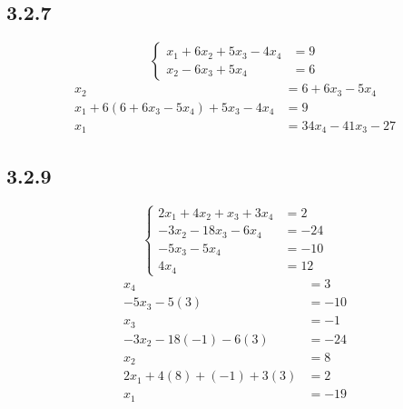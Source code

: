 \documentclass{article}
\begin{document}
\subsection{3.2.7}
\begin{equation*}
	\left\{
		\begin{aligned}
			x_1 + 6x_2 + 5x_3 - 4x_4 & = 9 \\
			x_2 - 6x_3 + 5x_4 & = 6
		\end{aligned}
	\right.
\end{equation*}
\begin{align*}
	x_2 & = 6 + 6x_3 - 5x_4 \\
	x_1 + 6(6 + 6x_3 - 5x_4) + 5x_3 - 4x_4 & = 9 \\
	x_1 & = 34x_4 - 41x_3 - 27
\end{align*}

\subsection{3.2.9}
\begin{equation*}
	\left\{
		\begin{aligned}
			2x_1 + 4x_2 + x_3 + 3x_4 & = 2 \\
			-3x_2 - 18x_3 - 6x_4 & = -24 \\
			-5x_3 - 5x_4 & = -10 \\
			4x_4 & = 12
		\end{aligned}
	\right.
\end{equation*}
\begin{align*}
	x_4 & = 3 \\
	-5x_3 - 5(3) & = -10 \\
	x_3 & = -1 \\
	-3x_2 - 18(-1) - 6(3) & = -24 \\
	x_2 & = 8 \\
	2x_1 + 4(8) + (-1) + 3(3) & = 2 \\
	x_1 & = -19
\end{align*}
\end{document}
